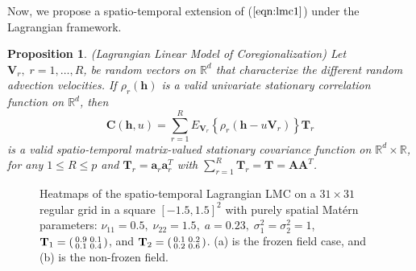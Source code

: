 \documentclass[12pt]{article}
\newcommand{\0}{\mathbf{0}}
\newtheorem{prop}{Proposition}
\begin{document}
Now, we propose a spatio-temporal extension of ($\ref{eqn:lmc1}$) under the Lagrangian framework.  
\nocite{wackernagel1998} \nocite{gelfand2002multivariate}

\begin{prop}\label{prop3}\label{expectedlagrangianlmc}
(Lagrangian Linear Model of Coregionalization) Let $\mathbf{V}_{r},\;r=1,\ldots,R$, be random vectors on $\mathbb{R}^d$ that characterize the different random advection velocities. If $\rho_{r}(\mathbf{h})$ is a valid univariate stationary correlation function on $\mathbb{R}^d$, then
\begin{equation}\label{spacetimelmc_expectation}
\mathbf{C}(\mathbf{h}, u)=\sum_{r=1}^{R} E_{\mathbf{V}_r}\left\{\rho_r(\mathbf{h}-u\mathbf{V}_r)\right\} \mathbf{T}_r
\end{equation}
is a valid spatio-temporal matrix-valued stationary covariance function on $\mathbb{R}^d \times \mathbb{R}$, for any $1\leq R\leq p$ and $\mathbf{T}_r=\mathbf{a}_r\mathbf{a}_r^T$ with $\sum_{r=1}^{R}\mathbf{T}_{r}=\mathbf{T}=\mathbf{A}\mathbf{A}^T$.
\end{prop}

\begin{figure}[!htbp]
 \centering
    \qquad
    \captionsetup[subfloat]{margin=-2cm}
     \caption{Heatmaps of the spatio-temporal Lagrangian LMC on a $31\times 31$ regular grid in a square $[-1.5,1.5]^2$ with purely spatial Mat\'{e}rn parameters: $\nu_{11}=0.5,\;\nu_{22}=1.5,\;a=0.23,\;\sigma_1^2=\sigma_2^2=1$, $\mathbf{T}_1=\left(\protect\begin{smallmatrix}0.9 & 0.1\\
    0.1 & 0.4\protect\end{smallmatrix}\right)$, and $\mathbf{T}_2=\left(\protect\begin{smallmatrix}0.1 & 0.2\\
    0.2 & 0.6\protect\end{smallmatrix}\right)$. (a) is the frozen field case, and (b) is the non-frozen field.}
   \label{fig:covariance_multiple_velocity}
   \end{figure}
   
\end{document}
